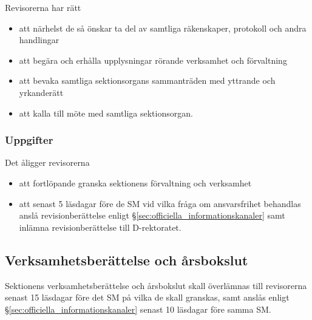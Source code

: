 \documentclass{dgovdoc}
\begin{document}
Revisorerna har rätt

\begin{itemize}
  \item att närhelst de så önskar ta del av samtliga räkenskaper, protokoll och
    andra handlingar
  \item att begära och erhålla upplysningar rörande verksamhet och förvaltning
  \item att bevaka samtliga sektionsorgans sammanträden med yttrande och
    yrkanderätt
  \item att kalla till möte med samtliga sektionsorgan.
\end{itemize}

\subsubsection{Uppgifter}

Det åligger revisorerna

\begin{itemize}
  \item att fortlöpande granska sektionens förvaltning och verksamhet
  \item att senast 5 läsdagar före de SM vid vilka fråga om ansvarsfrihet
    behandlas anslå revisionberättelse enligt
    \S\ref{sec:officiella_informationskanaler} samt inlämna revisionberättelse
    till D-rektoratet.
\end{itemize}

\subsection{Verksamhetsberättelse och årsbokslut}

Sektionens verksamhetsberättelse och årsbokslut skall överlämnas till
revisorerna senast 15 läsdagar före det SM på vilka de skall granskas, samt
anslås enligt \S\ref{sec:officiella_informationskanaler} senast 10 läsdagar före
samma SM.
\end{document}
